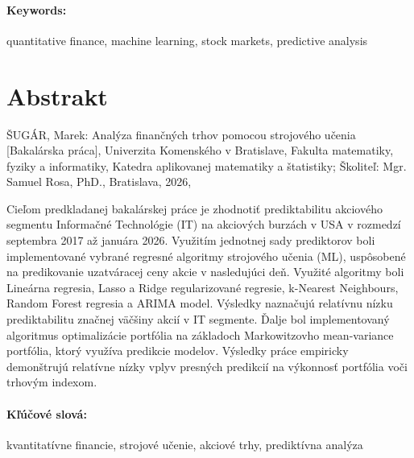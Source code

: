 \documentclass[12pt, oneside]{book}  %
\begin{document}
\paragraph*{Keywords:}  quantitative finance, machine learning, stock markets, predictive analysis

\newpage 
\section*{Abstrakt}

ŠUGÁR, Marek: Analýza finančných trhov pomocou strojového učenia [Bakalárska práca], Univerzita Komenského v Bratislave, Fakulta matematiky, fyziky a informatiky,
Katedra aplikovanej matematiky a štatistiky; Školiteľ: Mgr. Samuel Rosa, PhD., Bratislava, 2026, %


Cieľom predkladanej bakalárskej práce je zhodnotiť prediktabilitu akciového segmentu Informačné Technológie (IT) na akciových burzách v USA v rozmedzí septembra 2017 až januára 2026. Využitím jednotnej sady prediktorov boli
implementované vybrané regresné algoritmy strojového učenia (ML), uspôsobené na predikovanie uzatváracej ceny akcie v nasledujúci deň. Využité algoritmy boli Lineárna regresia, Lasso a Ridge regularizované regresie, k-Nearest Neighbours, Random Forest regresia a ARIMA model.
Výsledky naznačujú relatívnu nízku prediktabilitu značnej väčšiny akcií v IT segmente. Ďalje bol implementovaný algoritmus optimalizácie portfólia na základoch Markowitzovho mean-variance portfólia, ktorý využíva predikcie modelov.
Výsledky práce empiricky demonštrujú relatívne nízky vplyv presných predikcií na výkonnosť portfólia voči trhovým indexom.

\paragraph*{Kľúčové slová:} kvantitatívne financie, strojové učenie, akciové trhy, prediktívna analýza


%
%
%
%
\end{document}
